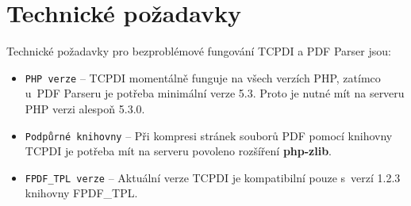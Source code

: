\section{Technické požadavky}
Technické požadavky pro bezproblémové fungování TCPDI a PDF Parser jsou:
\begin{itemize} 
	\item \verb|PHP verze| -- TCPDI  momentálně funguje na všech verzích PHP, zatímco u~PDF Parseru je potřeba minimální verze 5.3. Proto je nutné mít na serveru PHP verzi alespoň 5.3.0.
	\item \verb|Podpůrné knihovny| -- Při kompresi stránek souborů PDF pomocí knihovny TCPDI je potřeba mít na serveru povoleno rozšíření \textbf{php-zlib}.
	\item \verb|FPDF_TPL verze| -- Aktuální verze TCPDI je kompatibilní pouze s~verzí 1.2.3 knihovny FPDF\_TPL. 
\end{itemize}
